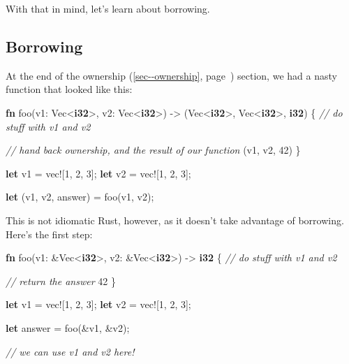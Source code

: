\documentclass[a4paper,]{book}
\renewcommand*{\hyperref}[2][\ar]{%
  \def\ar{#2}%
  #2 (\autoref{#1}, page~\pageref{#1})}
\newenvironment{Shaded}{\begin{snugshade}}{\end{snugshade}}
\newcommand{\KeywordTok}[1]{\textcolor[rgb]{0.13,0.29,0.53}{\textbf{{#1}}}}
\newcommand{\DecValTok}[1]{\textcolor[rgb]{0.00,0.00,0.81}{{#1}}}
\newcommand{\CommentTok}[1]{\textcolor[rgb]{0.56,0.35,0.01}{\textit{{#1}}}}
\newcommand{\OtherTok}[1]{\textcolor[rgb]{0.56,0.35,0.01}{{#1}}}
\newcommand{\NormalTok}[1]{{#1}}
\begin{document}
With that in mind, let's learn about borrowing.

\subsection{Borrowing}\label{borrowing}

At the end of the \hyperref[sec--ownership]{ownership} section, we had a
nasty function that looked like this:

\begin{Shaded}
\begin{Highlighting}[]
\KeywordTok{fn} \NormalTok{foo(v1: Vec<}\KeywordTok{i32}\NormalTok{>, v2: Vec<}\KeywordTok{i32}\NormalTok{>) -> (Vec<}\KeywordTok{i32}\NormalTok{>, Vec<}\KeywordTok{i32}\NormalTok{>, }\KeywordTok{i32}\NormalTok{) \{}
    \CommentTok{// do stuff with v1 and v2}

    \CommentTok{// hand back ownership, and the result of our function}
    \NormalTok{(v1, v2, }\DecValTok{42}\NormalTok{)}
\NormalTok{\}}

\KeywordTok{let} \NormalTok{v1 = }\OtherTok{vec!}\NormalTok{[}\DecValTok{1}\NormalTok{, }\DecValTok{2}\NormalTok{, }\DecValTok{3}\NormalTok{];}
\KeywordTok{let} \NormalTok{v2 = }\OtherTok{vec!}\NormalTok{[}\DecValTok{1}\NormalTok{, }\DecValTok{2}\NormalTok{, }\DecValTok{3}\NormalTok{];}

\KeywordTok{let} \NormalTok{(v1, v2, answer) = foo(v1, v2);}
\end{Highlighting}
\end{Shaded}

This is not idiomatic Rust, however, as it doesn't take advantage of
borrowing. Here's the first step:

\begin{Shaded}
\begin{Highlighting}[]
\KeywordTok{fn} \NormalTok{foo(v1: &Vec<}\KeywordTok{i32}\NormalTok{>, v2: &Vec<}\KeywordTok{i32}\NormalTok{>) -> }\KeywordTok{i32} \NormalTok{\{}
    \CommentTok{// do stuff with v1 and v2}

    \CommentTok{// return the answer}
    \DecValTok{42}
\NormalTok{\}}

\KeywordTok{let} \NormalTok{v1 = }\OtherTok{vec!}\NormalTok{[}\DecValTok{1}\NormalTok{, }\DecValTok{2}\NormalTok{, }\DecValTok{3}\NormalTok{];}
\KeywordTok{let} \NormalTok{v2 = }\OtherTok{vec!}\NormalTok{[}\DecValTok{1}\NormalTok{, }\DecValTok{2}\NormalTok{, }\DecValTok{3}\NormalTok{];}

\KeywordTok{let} \NormalTok{answer = foo(&v1, &v2);}

\CommentTok{// we can use v1 and v2 here!}
\end{Highlighting}
\end{Shaded}
\end{document}
